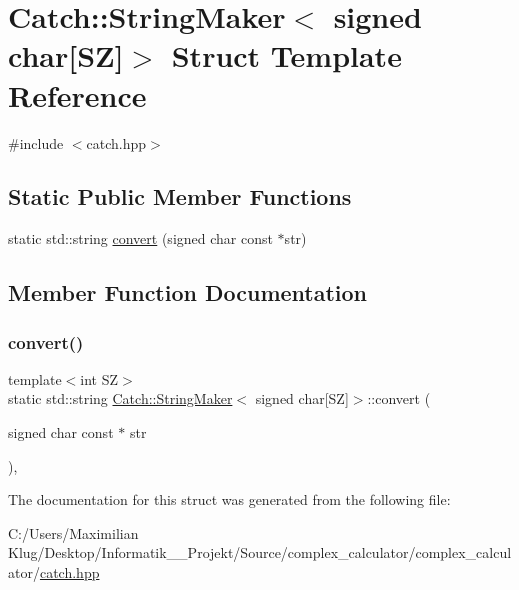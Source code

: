 \hypertarget{struct_catch_1_1_string_maker_3_01signed_01char[_s_z]_4}{}\section{Catch\+:\+:String\+Maker$<$ signed char\mbox{[}SZ\mbox{]}$>$ Struct Template Reference}
\label{struct_catch_1_1_string_maker_3_01signed_01char[_s_z]_4}


{\ttfamily \#include $<$catch.\+hpp$>$}

\subsection*{Static Public Member Functions}
\begin{DoxyCompactItemize}
\item 
static std\+::string \mbox{\hyperlink{struct_catch_1_1_string_maker_3_01signed_01char[_s_z]_4_a23ac689cc79dbcfe9b1765fe9e25690e}{convert}} (signed char const $\ast$str)
\end{DoxyCompactItemize}


\subsection{Member Function Documentation}
\mbox{\label{struct_catch_1_1_string_maker_3_01signed_01char[_s_z]_4_a23ac689cc79dbcfe9b1765fe9e25690e}} 
\subsubsection{\texorpdfstring{convert()}{convert()}}
{\footnotesize\ttfamily template$<$int SZ$>$ \\
static std\+::string \mbox{\hyperlink{struct_catch_1_1_string_maker}{Catch\+::\+String\+Maker}}$<$ signed char\mbox{[}SZ\mbox{]}$>$\+::convert (\begin{DoxyParamCaption}\item[{signed char const $\ast$}]{str }\end{DoxyParamCaption})\hspace{0.3cm}{\ttfamily [inline]}, {\ttfamily [static]}}



The documentation for this struct was generated from the following file\+:\begin{DoxyCompactItemize}
\item 
C\+:/\+Users/\+Maximilian Klug/\+Desktop/\+Informatik\+\_\+\_\+\+Projekt/\+Source/complex\+\_\+calculator/complex\+\_\+calculator/\mbox{\hyperlink{catch_8hpp}{catch.\+hpp}}\end{DoxyCompactItemize}
